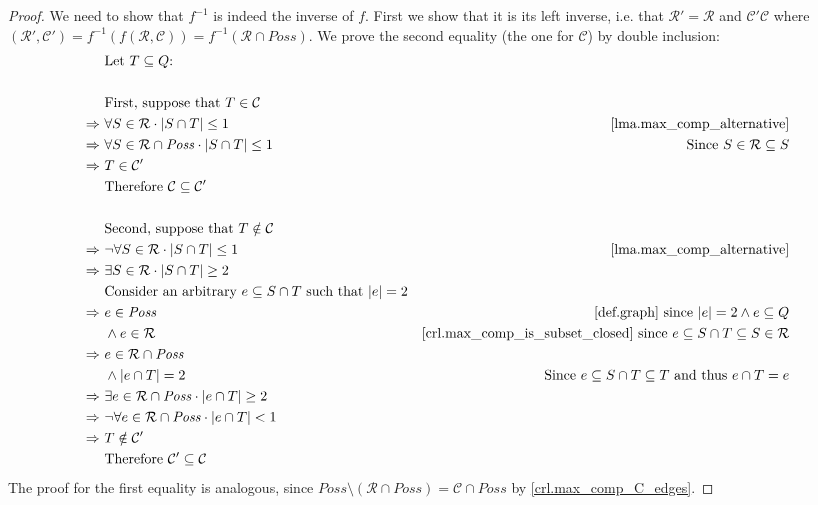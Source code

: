 \documentclass{report}
\DeclarePairedDelimiter{\abs}{\lvert}{\rvert}
\theoremstyle{definition}
\begin{document}
\begin{proof}
We need to show that $f^{-1}$ is indeed the inverse of $f$.
First we show that it is its left inverse, i.e. that
$\mathcal{R}' = \mathcal{R}$ and $\mathcal{C}' \mathcal{C}$ where
$(\mathcal{R}', \mathcal{C}') = f^{-1}(f(\mathcal{R}, \mathcal{C}))
= f^{-1}(\mathcal{R} \cap \mathit{Poss})$.
We prove the second equality (the one for $\mathcal{C}$) by double inclusion:
\begin{align*}
& \text{Let } T \subseteq Q \text{:} \\
\\
& \text{First, suppose that } T \in \mathcal{C} \\
\Rightarrow \ & \forall S \in \mathcal{R} \cdot \abs{S \cap T} \leq 1
& \text{\cref{lma.max_comp_alternative}} \\
\Rightarrow \ & \forall S \in \mathcal{R} \cap \mathit{Poss} \cdot \abs{S \cap T} \leq 1
& \text{Since } S \in \mathcal{R} \subseteq S \\
\Rightarrow \ & T \in \mathcal{C}' \\
& \text{Therefore } \mathcal{C} \subseteq \mathcal{C}' \\
\\
& \text{Second, suppose that } T \notin \mathcal{C} \\
\Rightarrow \ & \neg \forall S \in \mathcal{R} \cdot \abs{S \cap T} \leq 1
& \text{\cref{lma.max_comp_alternative}} \\
\Rightarrow \ & \exists S \in \mathcal{R} \cdot \abs{S \cap T} \geq 2 \\
& \text{Consider an arbitrary } e \subseteq S \cap T \text{ such that }
\abs{e} = 2 \\
\Rightarrow \ & e \in \mathit{Poss}
& \text{\cref{def.graph} since } \abs{e} = 2 \wedge e \subseteq Q \\
& \wedge e \in \mathcal{R}
& \text{\cref{crl.max_comp_is_subset_closed} since }
e \subseteq S \cap T \subseteq S \in \mathcal{R} \\
\Rightarrow \ & e \in \mathcal{R} \cap \mathit{Poss} \\
& \wedge \abs{e \cap T} = 2
& \text{Since } e \subseteq S \cap T \subseteq T \text{ and thus } e \cap T = e \\
\Rightarrow \ & \exists e \in \mathcal{R} \cap \mathit{Poss} \cdot \abs{e \cap T} \geq 2 \\
\Rightarrow \ & \neg \forall e \in \mathcal{R} \cap \mathit{Poss} \cdot \abs{e \cap T} < 1 \\
\Rightarrow \ & T \notin \mathcal{C}' \\
& \text{Therefore } \mathcal{C}' \subseteq \mathcal{C}
\end{align*}
The proof for the first equality is analogous, since
$\mathit{Poss} \setminus (\mathcal{R} \cap \mathit{Poss}) = \mathcal{C} \cap \mathit{Poss}$
by \cref{crl.max_comp_C_edges}.


\end{proof}
\end{document}
